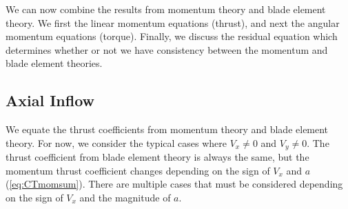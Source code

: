 \documentclass{article}
\begin{document}
We can now combine the results from momentum theory and blade element theory.  We first the linear momentum equations (thrust), and next the angular momentum equations (torque).  Finally, we discuss the residual equation which determines whether or not we have consistency between the momentum and blade element theories.

\subsection{Axial Inflow}

We equate the thrust coefficients from momentum theory and blade element theory.  For now, we consider the typical cases where $V_x \ne 0$ and $V_y \ne 0$.  The thrust coefficient from blade element theory is always the same, but the momentum thrust coefficient changes depending on the sign of $V_x$ and $a$ (\cref{eq:CTmomsum}).  There are multiple cases that must be considered depending on the sign of $V_x$ and the magnitude of $a$.
\end{document}
